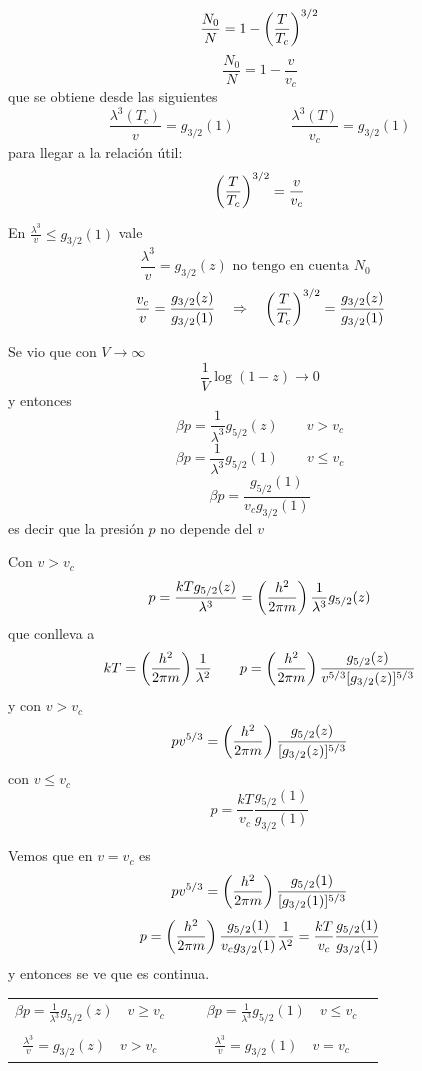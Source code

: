 \documentclass[10pt,oneside]{CBFT_book}
\begin{document}
\[
	\frac{N_0}{N} = 1 - \left( \frac{ T }{ T_c } \right)^{3/2}
\]
\[
	\frac{N_0}{N} = 1 - \frac{v}{v_c}
\]
que se obtiene desde las siguientes
\[
	\frac{\lambda^3(T_c)}{v} = g_{3/2}(1) \qquad \qquad  \frac{\lambda^3(T)}{v_c} = g_{3/2}(1)
\]
para llegar a la relación útil:
\[
	\left( \frac{ T }{ T_c } \right)^{3/2} = \frac{v}{v_c}
\]

En $ \frac{\lambda^3}{v} \leq g_{3/2}(1) $ vale 
\[
	\frac{\lambda^3}{v} = g_{3/2}(z) \text{ no tengo en cuenta $N_0$ }
\]
\[
	\frac{v_c}{v} = \frac{ g_{3/2}(z) }{ g_{3/2}(1) } \quad \Rightarrow \quad 
	\left( \frac{ T }{ T_c } \right)^{3/2} = \frac{ g_{3/2}(z) }{ g_{3/2}(1) } 
\]

Se vio que con $ V \to \infty $
\[
	\frac{1}{V} \log (1-z) \to 0 
\]
y entonces 
\[
	\beta p = \frac{1}{\lambda^3} g_{5/2}(z) \qquad v > v_c
\]
\[
	\beta p = \frac{1}{\lambda^3} g_{5/2}(1) \qquad v \leq v_c
\]
\[
	\beta p = \frac{ g_{5/2}(1) }{ v_c g_{3/2}(1) }
\]
es decir que la presión $p$ no depende del $v$

Con $v > v_c$ 
\[
	p = \frac{ k T g_{5/2}(z) }{\lambda^3} = \left( \frac{ h^2 }{  2\pi m  } \right) \frac{1}{\lambda^3} g_{5/2}(z)
\]
que conlleva a 
\[
	kT = \left( \frac{ h^2 }{  2\pi m  } \right) \frac{1}{\lambda^2} \qquad 
	p =  \left( \frac{ h^2 }{  2\pi m  } \right) \frac{ g_{5/2}(z) }{ v^{5/3} [ g_{3/2}(z) ]^{5/3} }
\]
y con $v > v_c$ 
\[
	pv^{5/3} = \left( \frac{ h^2 }{  2\pi m  } \right) \frac{ g_{5/2}(z) }{ [ g_{3/2}(z) ]^{5/3} }
\]
con $v \leq v_c$ 
\[
	p = \frac{ k T }{ v_c } \frac{ g_{5/2}(1) }{ g_{3/2}(1) }
\]

Vemos que en $ v = v_c $ es
\[
	pv^{5/3} = \left( \frac{ h^2 }{  2\pi m  } \right) \frac{ g_{5/2}(1) }{ [ g_{3/2}(1) ]^{5/3} }
\]
\[
	p = \left( \frac{ h^2 }{  2\pi m  } \right) \frac{ g_{5/2}(1) }{ v_c g_{3/2}(1) }\frac{1}{\lambda^2} =
	\frac{kT}{v_c}\frac{ g_{5/2}(1) }{ g_{3/2}(1) }
\]
y entonces se ve que es continua.

\begin{center}
\begin{tabular}{c|c}
 $\displaystyle \beta p = \frac{1}{\lambda^3} g_{5/2}(z) \quad v \geq v_c \quad $ & 
 $\displaystyle \quad \beta p = \frac{1}{\lambda^3} g_{5/2}(1) \quad v \leq v_c \quad $\\
 & \\
 $\displaystyle \frac{\lambda^3}{v} = g_{3/2}(z) \quad v > v_c \quad $ 
 & $\displaystyle \quad \frac{\lambda^3}{v} = g_{3/2}(1) \quad v = v_c \quad $
\end{tabular}
\end{center}
\end{document}
